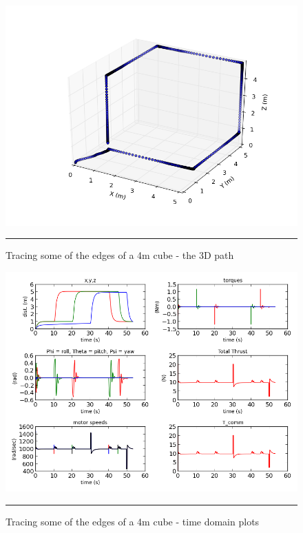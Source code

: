 \begin{figure}[htbp]
	\centering
		\includegraphics[width=\textwidth]{Figures/CubeEdges3D.png}
		\rule{35em}{0.5pt}
	\caption[Cube Edges 3D]{Tracing some of the edges of a 4m cube - the 3D path}
	\label{fig:Cube Edges 3D}
\end{figure}

\begin{figure}[htbp]
	\centering
		\includegraphics[width=\textwidth]{Figures/CubeEdgesGraphs.png}
		\rule{35em}{0.5pt}
	\caption[Cube Edges Time Domain]{Tracing some of the edges of a 4m cube - time domain plots}
	\label{fig:Cube Edges Time Domain}
\end{figure}


